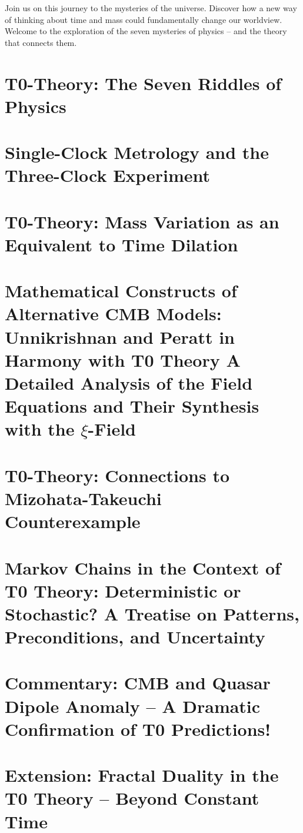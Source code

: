 \documentclass[11pt,openright,twoside]{book}
\begin{document}
Join us on this journey to the mysteries of the universe. Discover how a new way of thinking about time and mass could fundamentally change our worldview. Welcome to the exploration of the seven mysteries of physics – and the theory that connects them.

\chapter{T0-Theory: The Seven Riddles of Physics}


\chapter{Single-Clock Metrology and the Three-Clock Experiment}


\chapter{T0-Theory: Mass Variation as an Equivalent to Time Dilation}

\chapter{Mathematical Constructs of Alternative CMB Models: Unnikrishnan and Peratt in Harmony with T0 Theory A Detailed Analysis of the Field Equations and Their Synthesis with the $\xi$-Field}


\chapter{T0-Theory: Connections to Mizohata-Takeuchi Counterexample}


\chapter{Markov Chains in the Context of T0 Theory: Deterministic or Stochastic? A Treatise on Patterns, Preconditions, and Uncertainty}


\chapter{Commentary: CMB and Quasar Dipole Anomaly -- A Dramatic Confirmation of T0 Predictions!}


\chapter{Extension: Fractal Duality in the T0 Theory – Beyond Constant Time}

\end{document}
